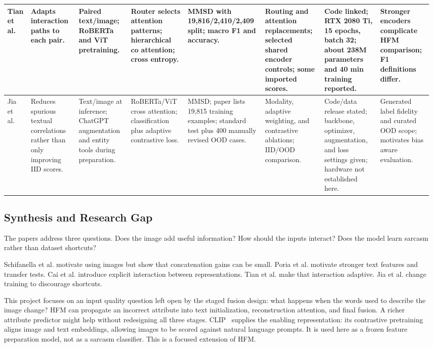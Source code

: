 \documentclass[conference]{IEEEtran}
\begin{document}
\begin{table}[t]
\begin{tabular}{|P{0.065\textwidth}|P{0.11\textwidth}|P{0.11\textwidth}|P{0.135\textwidth}|P{0.115\textwidth}|P{0.125\textwidth}|P{0.115\textwidth}|P{0.13\textwidth}|}
\hline
Tian et al.~\cite{tian2023} & Adapts interaction paths to each pair. & Paired text/image; RoBERTa and ViT pretraining. & Router selects attention patterns; hierarchical co attention; cross entropy. & MMSD with 19,816/2,410/2,409 split; macro F1 and accuracy. & Routing and attention replacements; selected shared encoder controls; some imported scores. & Code linked; RTX 2080 Ti, 15 epochs, batch 32; about 238M parameters and 40 min training reported. & Stronger encoders complicate HFM comparison; F1 definitions differ. \\
\hline
Jia et al.~\cite{jia2024} & Reduces spurious textual correlations rather than only improving IID scores. & Text/image at inference; ChatGPT augmentation and entity tools during preparation. & RoBERTa/ViT cross attention; classification plus adaptive contrastive loss. & MMSD; paper lists 19,815 training examples; standard test plus 400 manually revised OOD cases. & Modality, adaptive weighting, and contrastive ablations; IID/OOD comparison. & Code/data release stated; backbone, optimizer, augmentation, and loss settings given; hardware not established here. & Generated label fidelity and curated OOD scope; motivates bias aware evaluation. \\
\hline
\end{tabular}
\end{table}

\subsection{Synthesis and Research Gap}
The papers address three questions. Does the image add useful information? How should the inputs interact? Does the model learn sarcasm rather than dataset shortcuts?

Schifanella et al. motivate using images but show that concatenation gains can be small. Poria et al. motivate stronger text features and transfer tests. Cai et al. introduce explicit interaction between representations. Tian et al. make that interaction adaptive. Jia et al. change training to discourage shortcuts.

This project focuses on an input quality question left open by the staged fusion design: what happens when the words used to describe the image change? HFM can propagate an incorrect attribute into text initialization, reconstruction attention, and final fusion. A richer attribute predictor might help without redesigning all three stages. CLIP~\cite{radford2021} supplies the enabling representation: its contrastive pretraining aligns image and text embeddings, allowing images to be scored against natural language prompts. It is used here as a frozen feature preparation model, not as a sarcasm classifier. This is a focused extension of HFM.
\end{document}
